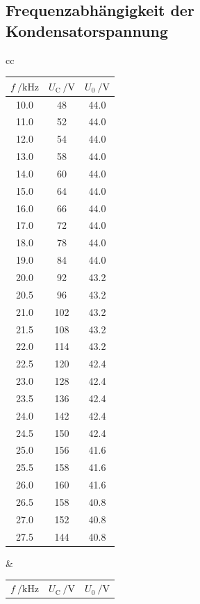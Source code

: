 \subsection{Frequenzabhängigkeit der Kondensatorspannung}
\begin{table}
	\centering
\setlength{\tabcolsep}{2mm}
\begin{tabular}{cc}
	\begin{tabular}{S[table-format=2.1] S[table-format=3.0] S[table-format=2.1] }
	\toprule
	{$f\:/{\si{\kilo\hertz}}$} & {$U_\mathup{C}\:/{\si{\volt}}$} & {$U_\mathup{0}\:/{\si{\volt}}$} \\
	\midrule

10.0 &  48 & 44.0\\
11.0 &  52 & 44.0\\
12.0 &  54 & 44.0\\
13.0 &  58 & 44.0\\
14.0 &  60 & 44.0\\
15.0 &  64 & 44.0\\
16.0 &  66 & 44.0\\
17.0 &  72 & 44.0\\
18.0 &  78 & 44.0\\
19.0 &  84 & 44.0\\
20.0 &  92 & 43.2\\
20.5 &  96 & 43.2\\
21.0 & 102 & 43.2\\
21.5 & 108 & 43.2\\
22.0 & 114 & 43.2\\
22.5 & 120 & 42.4\\
23.0 & 128 & 42.4\\
23.5 & 136 & 42.4\\
24.0 & 142 & 42.4\\
24.5 & 150 & 42.4\\
25.0 & 156 & 41.6\\
25.5 & 158 & 41.6\\
26.0 & 160 & 41.6\\
26.5 & 158 & 40.8\\
27.0 & 152 & 40.8\\
27.5 & 144 & 40.8\\
\bottomrule
	\end{tabular}
&	
	\begin{tabular}{S[table-format=2.1] S[table-format=3.0] S[table-format=2.1] }
	\toprule
	{$f\:/{\si{\kilo\hertz}}$} & {$U_\mathup{C}\:/{\si{\volt}}$} & {$U_\mathup{0}\:/{\si{\volt}}$} \\

\end{tabular}
\end{tabular}
\end{table}
